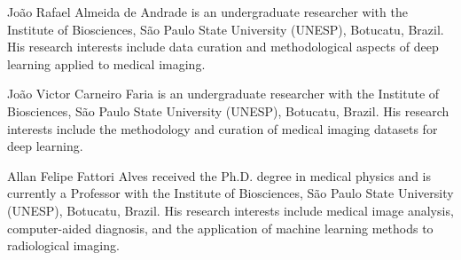 \documentclass{ieeeaccess}
\begin{document}
\begin{IEEEbiographynophoto}{Jo\~ao Rafael Almeida de Andrade}
is an undergraduate researcher with the Institute of Biosciences, S\~ao Paulo State University (UNESP), Botucatu, Brazil. His research interests include data curation and methodological aspects of deep learning applied to medical imaging.
\end{IEEEbiographynophoto}

\begin{IEEEbiographynophoto}{Jo\~ao Victor Carneiro Faria}
is an undergraduate researcher with the Institute of Biosciences, S\~ao Paulo State University (UNESP), Botucatu, Brazil. His research interests include the methodology and curation of medical imaging datasets for deep learning.
\end{IEEEbiographynophoto}

\begin{IEEEbiographynophoto}{Allan Felipe Fattori Alves}
received the Ph.D. degree in medical physics and is currently a Professor with the Institute of Biosciences, S\~ao Paulo State University (UNESP), Botucatu, Brazil. His research interests include medical image analysis, computer-aided diagnosis, and the application of machine learning methods to radiological imaging.
\end{IEEEbiographynophoto}

\EOD
\end{document}
